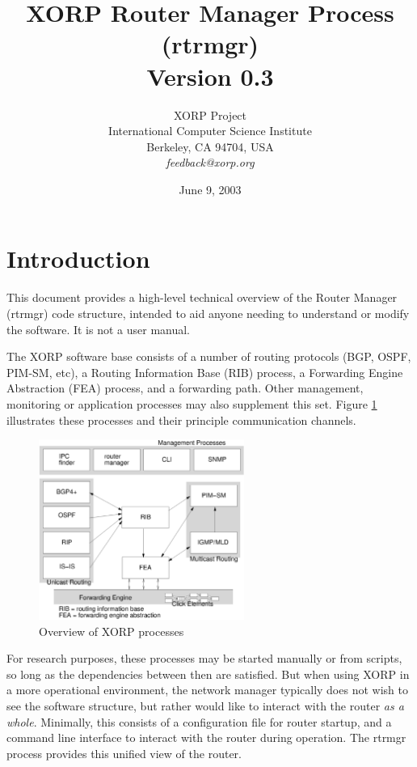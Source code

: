 \documentclass[11pt]{article}
\title{XORP Router Manager Process (rtrmgr) \\
\vspace{1ex}
Version 0.3}
\author{ XORP Project					\\
	 International Computer Science Institute	\\
	 Berkeley, CA 94704, USA			\\
	 {\it feedback@xorp.org}
}
\date{June 9, 2003}
\begin{document}
\maketitle                            
\section{Introduction}
This document provides a high-level technical overview of the Router
Manager (rtrmgr) code structure, intended to aid anyone needing to
understand or modify the software.   It is not a user manual.

The XORP software base consists of a number of routing protocols (BGP,
OSPF, PIM-SM, etc), a Routing Information Base (RIB) process, a
Forwarding Engine Abstraction (FEA) process, and a forwarding path.
Other management, monitoring or application processes may also
supplement this set.  Figure \ref{overview} illustrates these
processes and their principle communication channels.

\begin{figure}[htb]
\centerline{\includegraphics[width=0.6\textwidth]{figs/processes3}}
\vspace{.05in}
\caption{\label{overview}Overview of XORP processes}
\end{figure}

For research purposes, these processes may be started manually or from
scripts, so long as the dependencies between then are satisfied.  But
when using XORP in a more operational environment, the network manager
typically does not wish to see the software structure, but rather
would like to interact with the router {\it as a whole}.  Minimally, this
consists of a configuration file for router startup, and a command
line interface to interact with the router during operation.  The
rtrmgr process provides this unified view of the router.
\end{document}
